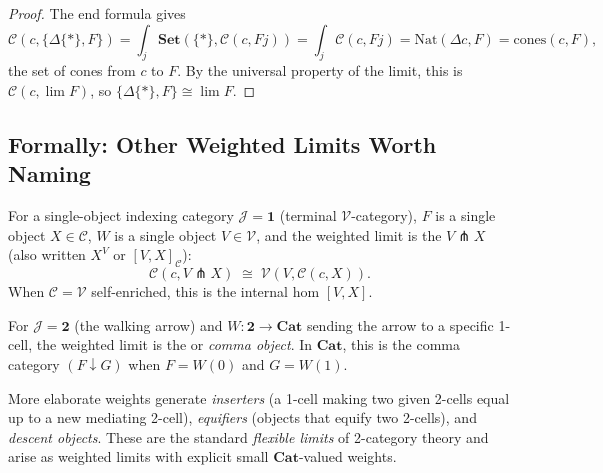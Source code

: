 \begin{proof}
The end formula gives
\begin{equation*}
  \mathcal{C}(c, \{\Delta\{*\}, F\})
  = \int_j \mathbf{Set}(\{*\}, \mathcal{C}(c, F j))
  = \int_j \mathcal{C}(c, F j)
  = \mathrm{Nat}(\Delta c, F)
  = \mathrm{cones}(c, F),
\end{equation*}
the set of cones from $c$ to $F$. By the universal property of the limit,
this is $\mathcal{C}(c, \lim F)$, so $\{\Delta\{*\}, F\} \cong \lim F$.
\end{proof}

\subsection{Formally: Other Weighted Limits Worth Naming}

\begin{example_thm}[Cotensor]
\label{ex:cotensor}
For a single-object indexing category $\mathcal{J} = \mathbf{1}$ (terminal
$\mathcal{V}$-category), $F$ is a single object $X \in \mathcal{C}$, $W$ is a
single object $V \in \mathcal{V}$, and the weighted limit is the
 $V \pitchfork X$ (also written $X^V$ or $[V, X]_\mathcal{C}$):
\begin{equation*}
  \mathcal{C}(c, V \pitchfork X) \;\cong\; \mathcal{V}(V, \mathcal{C}(c, X)).
\end{equation*}
When $\mathcal{C} = \mathcal{V}$ self-enriched, this is the internal hom
$[V, X]$.
\end{example_thm}

\begin{example_thm}
For $\mathcal{J} = \mathbf{2}$ (the walking arrow) and $W : \mathbf{2} \to
\mathbf{Cat}$ sending the arrow to a specific 1-cell, the weighted limit is
the  or \emph{comma object}. In $\mathbf{Cat}$, this is the
comma category $(F \downarrow G)$ when $F = W(0)$ and $G = W(1)$.
\end{example_thm}

\begin{example_thm}
More elaborate weights generate \emph{inserters} (a 1-cell making two given
2-cells equal up to a new mediating 2-cell), \emph{equifiers} (objects that
equify two 2-cells), and \emph{descent objects}. These are the standard
\emph{flexible limits} of 2-category theory and arise as weighted limits
with explicit small $\mathbf{Cat}$-valued weights.
\end{example_thm}


